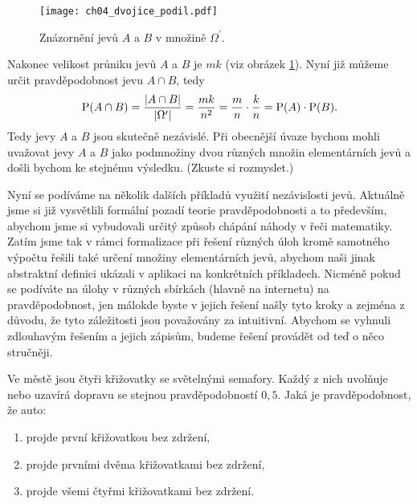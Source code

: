 \begin{figure}[H]
    \centering
    \texttt{[image: ch04\_dvojice\_podil.pdf]}
    \caption{Znázornění jevů $A$ a $B$ v množině $\Omega^\prime$.}
    \label{fig:dvojice_podil}
\end{figure}
Nakonec velikost průniku jevů $A$ a $B$ je $mk$ (viz obrázek \ref{fig:dvojice_podil}). Nyní již můžeme určit pravděpodobnost jevu $A\cap B$, tedy
\[\operatorname{\text{P}}(A\cap B)=\dfrac{\left| A\cap B \right|}{\left| \Omega^\prime \right|}=\dfrac{mk}{n^2}=\dfrac{m}{n}\cdot\dfrac{k}{n}=\operatorname{\text{P}}(A)\cdot\operatorname{\text{P}}(B).\]
Tedy jevy $A$ a $B$ jsou skutečně nezávislé. Při obecnější úvaze bychom mohli uvažovat jevy $A$ a $B$ jako podmnožiny dvou různých množin elementárních jevů a došli bychom ke stejnému výsledku. (Zkuste si rozmyslet.)
\medskip

Nyní se podíváme na několik dalších příkladů využití nezávislosti jevů. Aktuálně jsme si již vysvětlili formální pozadí teorie pravděpodobnosti a to především, abychom jsme si vybudovali určitý způsob chápání náhody v řeči matematiky. Zatím jsme tak v rámci formalizace při řešení různých úloh kromě samotného výpočtu řešili také určení množiny elementárních jevů, abychom naši jinak abstraktní definici ukázali v aplikaci na konkrétních příkladech. Nicméně pokud se podíváte na úlohy v různých sbírkách (hlavně na internetu) na pravděpodobnost, jen málokde byste v jejich řešení našly tyto kroky a zejména z důvodu, že tyto záležitosti jsou považovány za intuitivní. Abychom se vyhnuli zdlouhavým řešením a jejich zápisům, budeme řešení provádět od teď o něco stručněji.
\begin{task}
    Ve městě jsou čtyři křižovatky se světelnými semafory. Každý z nich uvolňuje nebo uzavírá dopravu se stejnou pravděpodobností $0{,}5$. Jaká je pravděpodobnost, že auto:
    \begin{enumerate}[label=(\alph*)]
        \item projde první křižovatkou bez zdržení,
        \item projde prvními dvěma křižovatkami bez zdržení,
        \item projde všemi čtyřmi křižovatkami bez zdržení.
    \end{enumerate}
\end{task}
